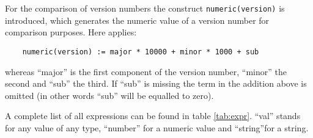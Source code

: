     For the comparison of version numbers the construct \texttt{numeric(version)}
    is introduced, which generates the numeric value of a version number for
    comparison purposes. Here applies:


\begin{example}
\begin{verbatim}
    numeric(version) := major * 10000 + minor * 1000 + sub
\end{verbatim}
\end{example}

    whereas ``major'' is the first component of the version number, ``minor'' the
    second and ``sub'' the third. If ``sub'' is missing the term in the addition above
    is omitted (in other words ``sub'' will be equalled to zero).

    A complete list of all expressions can be found in table \ref{tab:expr}. ``val''
    stands for any value of any type, ``number'' for a numeric value and ``string''for
    a string.

